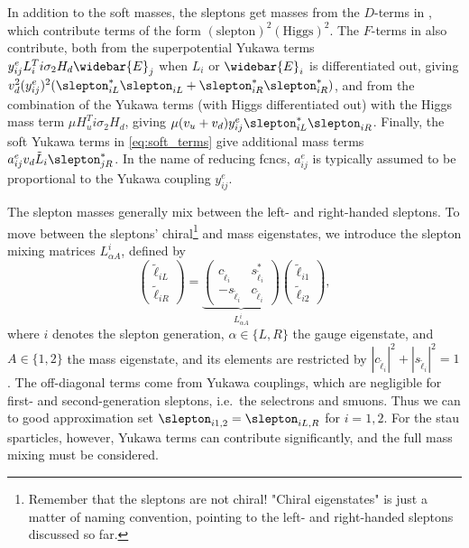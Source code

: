 In addition to the soft masses, the sleptons get masses from the $D$-terms in , which contribute terms of the form $(\text{slepton})^2(\text{Higgs})^2$.
The $F$-terms in  also contribute, both from the superpotential Yukawa terms $y_{ij}^e L_i^T i\sigma_2 H_d \widebar{E}_j$ when $L_i$ or $\widebar{E}_i$ is differentiated out, giving $v_d^2(y_{ij}^e)^2 (\slepton_{iL}^*\slepton_{iL} + \slepton_{iR}^*\slepton_{iR}^*)$, and from the combination of the Yukawa terms (with Higgs differentiated out) with the Higgs mass term $\mu H_u^T i\sigma_2 H_d$, giving $\mu (v_u+v_d) y_{ij}^e \slepton_{iL}^*\slepton_{iR}$. Finally, the soft Yukawa terms in \cref{eq:soft_terms} give additional mass terms $a_{ij}^e v_d \tilde{L}_i \slepton_{jR}^*$. In the name of reducing \glspl{fcnc}, $a_{ij}^e$ is typically assumed to be proportional to the Yukawa coupling $y_{ij}^e$.

The slepton masses generally mix between the left- and right-handed sleptons. To move between the sleptons' chiral\footnote{Remember that the sleptons are not chiral! "Chiral eigenstates" is just a matter of naming convention, pointing to the left- and right-handed sleptons discussed so far.} and mass eigenstates, we introduce the slepton mixing matrices $L^i_{\alpha A}$, defined by
\begin{equation}\label{eq:slepton_mass_mixing}
    \begin{pmatrix}
        \tilde\ell_{iL} \\ \tilde\ell_{iR}
    \end{pmatrix} = \underbrace{\begin{pmatrix}
        c_{\tilde\ell_i} & s_{\tilde\ell_i}^* \\
        -s_{\tilde\ell_i} & c_{\tilde\ell_i}
    \end{pmatrix}}_{L^i_{\alpha A}} \begin{pmatrix}
        \tilde\ell_{i1} \\ \tilde\ell_{i2}
    \end{pmatrix},
\end{equation}
where $i$ denotes the slepton generation, $\alpha\in\{L,R\}$ the gauge eigenstate, and $A\in\{1,2\}$ the mass eigenstate, and its elements are restricted by $|c_{\tilde\ell_i}|^2+|s_{\tilde\ell_i}|^2=1$.
The off-diagonal terms come from Yukawa couplings, which are negligible for first- and second-generation sleptons, i.e.\ the selectrons and smuons. Thus we can to good approximation set $\slepton_{i1,2} = \slepton_{iL,R}$ for $i=1,2$.
For the stau sparticles, however, Yukawa terms can contribute significantly, and the full mass mixing must be considered.


